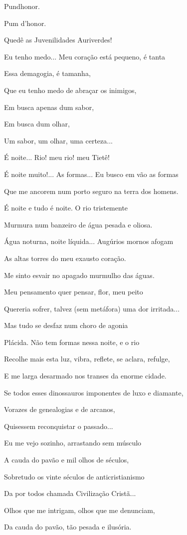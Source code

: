 Pundhonor.

Pum d'honor.

Quedê as Juvenilidades Auriverdes!

Eu tenho medo... Meu coração está pequeno, é tanta

Essa demagogia, é tamanha,

Que eu tenho medo de abraçar os inimigos,

Em busca apenas dum sabor,

Em busca dum olhar,

Um sabor, um olhar, uma certeza...

É noite... Rio! meu rio! meu Tietê!

É noite muito!... As formas... Eu busco em vão as formas

Que me ancorem num porto seguro na terra dos homens.

É noite e tudo é noite. O rio tristemente

Murmura num banzeiro de água pesada e oliosa.

Água noturna, noite líquida... Augúrios mornos afogam

As altas torres do meu exausto coração.

Me sinto esvair no apagado murmulho das águas.

Meu pensamento quer pensar, flor, meu peito

Quereria sofrer, talvez (sem metáfora) uma dor irritada...

Mas tudo se desfaz num choro de agonia

Plácida. Não tem formas nessa noite, e o rio

Recolhe mais esta luz, vibra, reflete, se aclara, refulge,

E me larga desarmado nos transes da enorme cidade.

Se todos esses dinossauros imponentes de luxo e diamante,

Vorazes de genealogias e de arcanos,

Quisessem reconquistar o passado...

Eu me vejo sozinho, arrastando sem músculo

A cauda do pavão e mil olhos de séculos,

Sobretudo os vinte séculos de anticristianismo

Da por todos chamada Civilização Cristã...

Olhos que me intrigam, olhos que me denunciam,

Da cauda do pavão, tão pesada e ilusória.

